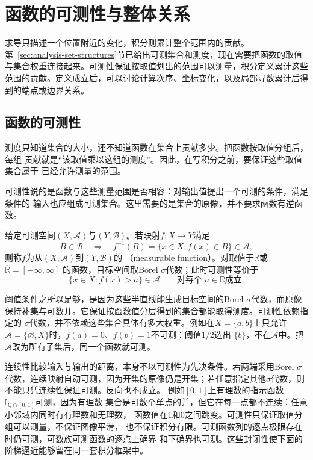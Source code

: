 \section{函数的可测性与整体关系}
\label{sec:analysis-integration-average}

求导只描述一个位置附近的变化，积分则累计整个范围内的贡献。第~\ref{sec:analysis-set-structures}节已给出可测集合和测度，现在需要把函数的取值与集合权重连接起来。可测性保证按取值划出的范围可以测量，积分定义累计这些范围的贡献。定义成立后，可以讨论计算次序、坐标变化，以及局部导数累计后得到的端点或边界关系。

\subsection{函数的可测性}

测度只知道集合的大小，还不知道函数在集合上贡献多少。把函数按取值分组后，每组
贡献就是“该取值乘以这组的测度”。因此，在写积分之前，要保证这些取值集合属于
已经允许测量的范围。

可测性说的是函数与这些测量范围是否相容：对输出值提出一个可测的条件，满足条件的
输入也应组成可测集合。这里需要的是集合的原像，并不要求函数有逆函数。
\begin{definition}[可测函数]
\label{def:analysis-measurable-function}
给定可测空间$(X,\mathcal{A})$与$(Y,\mathcal{B})$。若映射$f:X\to Y$满足
\[
  B\in\mathcal{B}\quad\Longrightarrow\quad
  f^{-1}(B)=\{x\in X:f(x)\in B\}\in\mathcal{A},
\]
则称$f$为从$(X,\mathcal{A})$到$(Y,\mathcal{B})$的
（measurable function）。对取值于$\mathbb{R}$或$\overline{\mathbb{R}}=[-\infty,\infty]$
的函数，目标空间取Borel $\sigma$代数；此时可测性等价于
\[
  \{x\in X:f(x)>a\}\in\mathcal{A}
  \qquad\text{对每个 }a\in\mathbb{R}\text{成立}.
\]
\end{definition}
阈值条件之所以足够，是因为这些半直线能生成目标空间的Borel $\sigma$代数，而原像
保持补集与可数并。它保证按函数值分层得到的集合都能取得测度。可测性依赖指定的
$\sigma$代数，并不依赖这些集合具体有多大权重。例如在$X=\{a,b\}$上只允许
$\mathcal{A}=\{\varnothing,X\}$时，$f(a)=0$、$f(b)=1$不可测：阈值$1/2$选出
$\{b\}$，不在$\mathcal{A}$中。把$\mathcal{A}$改为所有子集后，同一个函数就可测。

连续性比较输入与输出的距离，本身不以可测性为先决条件。若两端采用Borel $\sigma$代数，连续映射自动可测，因为开集的原像仍是开集；若任意指定其他$\sigma$代数，则不能只凭连续性保证可测。反向也不成立。
例如$[0,1]$上有理数的指示函数$\mathbb{I}_{\mathbb{Q}\cap[0,1]}$可测，因为有理数
集合是可数个单点的并，但它在每一点都不连续：任意小邻域内同时有有理数和无理数，
函数值在$1$和$0$之间跳变。可测性只保证取值分组可以测量，不保证图像平滑，
也不保证积分有限。可测函数列的逐点极限存在时仍可测，可数族可测函数的逐点上确界
和下确界也可测。这些封闭性使下面的阶梯逼近能够留在同一套积分框架中。

